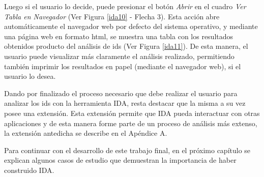 Luego si el usuario lo decide, puede presionar el botón \textit{Abrir} en el cuadro \textit{Ver Tabla en Navegador} (Ver Figura \ref{ida10} - Flecha 3). Esta acción abre automáticamente el navegador web por defecto del sistema operativo, y mediante una página web en formato html, se muestra una tabla con los resultados obtenidos producto del análisis de ids (Ver Figura \ref{ida11}). De esta manera, el usuario puede visualizar más claramente el análisis realizado, permitiendo también imprimir los resultados en papel (mediante el navegador web), si el usuario lo desea.

Dando por finalizado el proceso necesario que debe realizar el usuario para analizar los ids con la herramienta IDA, resta destacar que la misma a su vez posee una extensión. Esta extensión permite que IDA pueda interactuar con otras aplicaciones y de esta manera forme parte de un proceso de análisis más extenso, la extensión antedicha se describe en el Apéndice A. 

Para continuar con el desarrollo de este trabajo final, en el próximo capítulo se explican algunos casos de estudio que demuestran la importancia de haber construido IDA.

